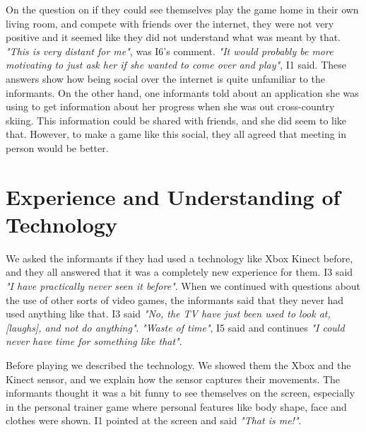 On the question on if they could see themselves play the game home in their own living room, and compete with friends over the internet, they were not very positive and it seemed like they did not understand what was meant by that. \emph{"This is very distant for me"}, was I6's comment. \emph{"It would probably be more motivating to just ask her if she wanted to come over and play"}, I1 said. These answers show how being social over the internet is quite unfamiliar to the informants. On the other hand, one informants told about an application she was using to get information about her progress when she was out cross-country skiing. This information could be shared with friends, and she did seem to like that. However, to make a game like this social, they all agreed that meeting in person would be better.

\section{Experience and Understanding of Technology}
We asked the informants if they had used a technology like Xbox Kinect before, and they all answered that it was a completely new experience for them. I3 said \emph{"I have practically never seen it before"}. When we continued with questions about the use of other sorts of video games, the informants said that they never had used anything like that. I3 said \emph{"No, the TV have just been used to look at, [laughs], and not do anything"}. \emph{"Waste of time"}, I5 said and continues \emph{"I could never have time for something like that"}.  

Before playing we described the technology. We showed them the Xbox and the Kinect sensor, and we explain how the sensor captures their movements. The informants thought it was a bit funny to see themselves on the screen, especially in the personal trainer game where personal features like body shape, face and clothes were shown. I1 pointed at the screen and said \emph{"That is me!"}. 

